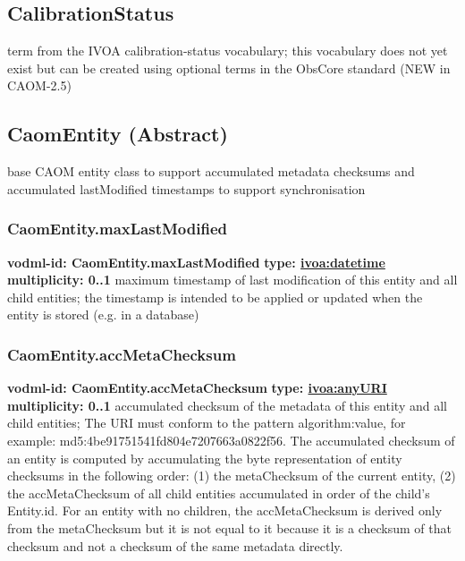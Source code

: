   \subsection{CalibrationStatus}
  \label{sect:CalibrationStatus}
    term from the IVOA calibration-status vocabulary; this vocabulary does not yet exist but can be created using optional terms in the ObsCore standard (NEW in CAOM-2.5)

  \subsection{CaomEntity (Abstract)}
  \label{sect:CaomEntity}
    base CAOM entity class to support accumulated metadata checksums and accumulated lastModified timestamps to support synchronisation

    \subsubsection{CaomEntity.maxLastModified}
      \textbf{vodml-id: CaomEntity.maxLastModified} \newline
      \textbf{type: \hyperref[sect:ivoa]{ivoa:datetime}} \newline
      \textbf{multiplicity: 0..1} \newline
      maximum timestamp of last modification of this entity and all child entities; the timestamp is intended to be applied or updated when the entity is stored (e.g. in a database)

    \subsubsection{CaomEntity.accMetaChecksum}
      \textbf{vodml-id: CaomEntity.accMetaChecksum} \newline
      \textbf{type: \hyperref[sect:ivoa]{ivoa:anyURI}} \newline
      \textbf{multiplicity: 0..1} \newline
      accumulated checksum of the metadata of this entity and all child entities; The URI must conform to the pattern {algorithm}:{value}, for example: md5:4be91751541fd804e7207663a0822f56. The accumulated checksum of an entity is computed by accumulating the byte representation of entity checksums in the following order: (1) the metaChecksum of the current entity, (2) the accMetaChecksum of all child entities accumulated in order of the child's Entity.id. For an entity with no children, the accMetaChecksum is derived only from the metaChecksum but it is not equal to it because it is a checksum of that checksum and not a checksum of the same metadata directly.

